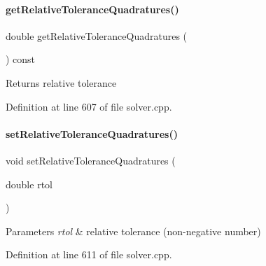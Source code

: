 \paragraph{\texorpdfstring{getRelativeToleranceQuadratures()}{getRelativeToleranceQuadratures()}}
{\footnotesize\ttfamily double get\+Relative\+Tolerance\+Quadratures (\begin{DoxyParamCaption}{ }\end{DoxyParamCaption}) const}

\begin{DoxyReturn}{Returns}
relative tolerance 
\end{DoxyReturn}


Definition at line 607 of file solver.\+cpp.

\mbox{\label{classamici_1_1_solver_a086428d30274f2b7e6f94e8e7593dd8b}} 
\paragraph{\texorpdfstring{setRelativeToleranceQuadratures()}{setRelativeToleranceQuadratures()}}
{\footnotesize\ttfamily void set\+Relative\+Tolerance\+Quadratures (\begin{DoxyParamCaption}\item[{double}]{rtol }\end{DoxyParamCaption})}


\begin{DoxyParams}{Parameters}
{\em rtol} & relative tolerance (non-\/negative number) \\
\hline
\end{DoxyParams}


Definition at line 611 of file solver.\+cpp.

